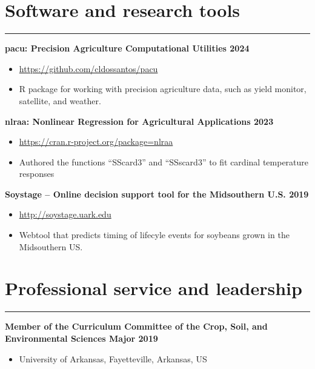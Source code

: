 \documentclass[letterpaper,10pt]{article}
\begin{document}
\section*{\sc Software and research tools}
\hrule
\vspace{.1in}



{\bf pacu: Precision Agriculture Computational  Utilities \hfill  2024}
\vspace{-.1in}
\begin{itemize}
\itemsep-0.5em
\renewcommand\labelitemi{{\boldmath$\cdot$}}
\item 
\href{https://github.com/cldossantos/pacu}{https://github.com/cldossantos/pacu}
\item R package for working with precision
	agriculture data, such as yield monitor,
	satellite, and weather. 
\end{itemize}

{\bf nlraa: Nonlinear Regression for Agricultural
Applications \hfill 2023}
\vspace{-.1in}
\begin{itemize}
\itemsep-0.5em
\renewcommand\labelitemi{{\boldmath$\cdot$}}
\item 
\href{https://cran.r-project.org/package=nlraa}{https://cran.r-project.org/package=nlraa}
\item Authored the functions ``SScard3'' and
	``SSscard3'' to fit cardinal temperature
	responses
\end{itemize}

{\bf Soystage – Online decision support tool for the Midsouthern U.S. \hfill 2019}
\vspace{-.1in}
\begin{itemize}
\itemsep-0.5em
\renewcommand\labelitemi{{\boldmath$\cdot$}}
\item 
\href{http://soystage.uark.edu}{http://soystage.uark.edu}
\item Webtool that predicts timing of lifecyle
	events for soybeans grown in the
	Midsouthern US.
\end{itemize}



\section*{\sc Professional service and leadership}
\hrule
\vspace{.1in}
{\bf Member of the Curriculum Committee of the
Crop, Soil, and Environmental Sciences Major \hfill  2019}
\vspace{-.1in}
\begin{itemize}
\itemsep-0.5em
\renewcommand\labelitemi{{\boldmath$\cdot$}}
\item 
University of Arkansas,
Fayetteville, Arkansas, US
\end{itemize}
\end{document}

